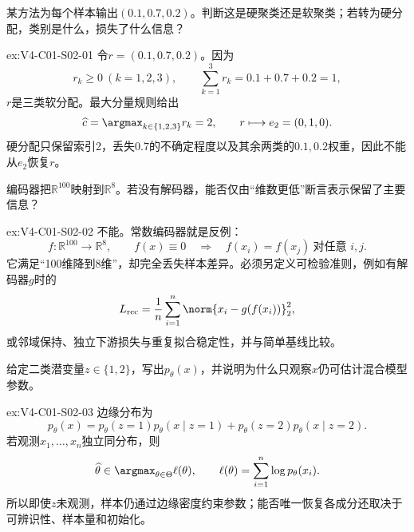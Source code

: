 \begin{SLChapterExercisePairSection}
\begin{exercise}\label{ex:V4-C01-S02-01}
某方法为每个样本输出$(0.1,0.7,0.2)$。判断这是硬聚类还是软聚类；若转为硬分配，类别是什么，损失了什么信息？
\end{exercise}
\ifSLFullEdition
{}\label{sol:V4-C01-S02-01}
\begin{chapterexercisesolution}{ex:V4-C01-S02-01}
令$r=(0.1,0.7,0.2)$。因为
\[
r_k\ge0\ (k=1,2,3),
\qquad
\sum_{k=1}^{3}r_k=0.1+0.7+0.2=1,
\]
$r$是三类软分配。最大分量规则给出
\[
\widehat c=\argmax_{k\in\{1,2,3\}}r_k=2,
\qquad
r\longmapsto e_2=(0,1,0).
\]
硬分配只保留索引2，丢失$0.7$的不确定程度以及其余两类的$0.1,0.2$权重，因此不能从$e_2$恢复$r$。
\end{chapterexercisesolution}
\fi

\begin{exercise}\label{ex:V4-C01-S02-02}
编码器把$\mathbb R^{100}$映射到$\mathbb R^{8}$。若没有解码器，能否仅由“维数更低”断言表示保留了主要信息？
\end{exercise}
\ifSLFullEdition
{}\label{sol:V4-C01-S02-02}
\begin{chapterexercisesolution}{ex:V4-C01-S02-02}
不能。常数编码器就是反例：
\[
f:\mathbb R^{100}\to\mathbb R^8,
\qquad
f(x)\equiv0
\quad\Longrightarrow\quad
f(x_i)=f(x_j)\ \text{对任意 }i,j.
\]
它满足“100维降到8维”，却完全丢失样本差异。必须另定义可检验准则，例如有解码器$g$时的
\[
L_{\mathrm{rec}}=\frac1n\sum_{i=1}^{n}\norm{x_i-g(f(x_i))}_2^2,
\]
或邻域保持、独立下游损失与重复拟合稳定性，并与简单基线比较。
\end{chapterexercisesolution}
\fi

\begin{exercise}\label{ex:V4-C01-S02-03}
给定二类潜变量$z\in\{1,2\}$，写出$p_\theta(x)$，并说明为什么只观察$x$仍可估计混合模型参数。
\end{exercise}
\ifSLFullEdition
{}\label{sol:V4-C01-S02-03}
\begin{chapterexercisesolution}{ex:V4-C01-S02-03}
边缘分布为
\[
p_\theta(x)=p_\theta(z=1)p_\theta(x\mid z=1)+p_\theta(z=2)p_\theta(x\mid z=2).
\]
若观测$x_1,\ldots,x_n$独立同分布，则
\[
\widehat\theta\in\argmax_{\theta\in\Theta}
\ell(\theta),
\qquad
\ell(\theta)=\sum_{i=1}^{n}\log p_\theta(x_i).
\]
所以即使$z$未观测，样本仍通过边缘密度约束参数；能否唯一恢复各成分还取决于可辨识性、样本量和初始化。
\end{chapterexercisesolution}
\fi


\end{SLChapterExercisePairSection}
